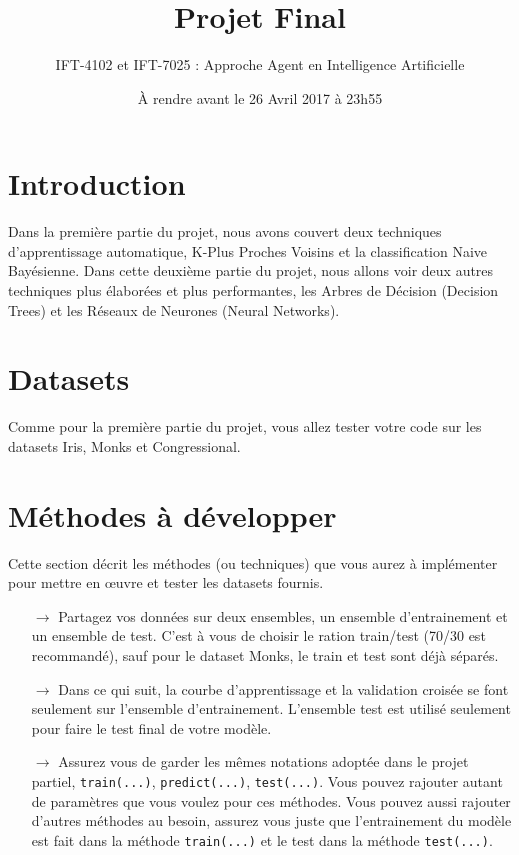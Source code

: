 \documentclass[latter,12pt]{article}
\title{\textbf{Projet Final}}
\author{IFT-4102 et IFT-7025 : Approche Agent en Intelligence Artificielle}
\date{À rendre avant le 26 Avril 2017 à 23h55}
\begin{document}
\maketitle



\section*{Introduction}
Dans la première partie du projet, nous avons couvert deux techniques d'apprentissage automatique, K-Plus Proches Voisins et la classification Naive Bayésienne. Dans cette deuxième partie du projet, nous allons voir deux autres techniques plus élaborées et plus performantes, les Arbres de Décision (Decision Trees) et les Réseaux de Neurones (Neural Networks).

\section{Datasets}
Comme pour la première partie du projet, vous allez tester votre code sur les datasets Iris, Monks et Congressional.

\section{Méthodes à développer}
Cette section décrit les méthodes (ou techniques) que vous aurez à implémenter pour mettre en œuvre et tester les datasets fournis.


\begin{itemize}
\item[$\rightarrow$] Partagez vos données sur deux ensembles, un ensemble d'entrainement et un ensemble de test. C'est à vous de choisir le ration train/test (70/30 est recommandé), sauf pour le dataset Monks, le train et test sont déjà séparés.

\item[$\rightarrow$] Dans ce qui suit, la courbe d'apprentissage et la validation croisée se font seulement sur l'ensemble d'entrainement. L'ensemble test est utilisé seulement pour faire le test final de votre modèle.

\item[$\rightarrow$] Assurez vous de garder les mêmes notations adoptée dans le projet partiel, \verb!train(...)!, \verb!predict(...)!, \verb!test(...)!. Vous pouvez rajouter autant de paramètres que vous voulez pour ces méthodes. Vous pouvez aussi rajouter d'autres méthodes au besoin, assurez vous juste que l'entrainement du modèle est fait dans la méthode \verb!train(...)! et le test dans la méthode \verb!test(...)!.
\end{itemize}
 
\end{document}
